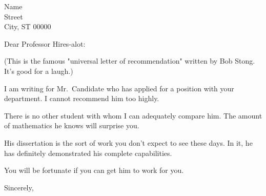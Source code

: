 \documentclass[11pt]{letter}
\begin{document}
\signature{Joe Schmo \\ Professor of Mathematics}

\begin{letter}{Name \\
Street \\
City, ST 00000}

\opening{Dear Professor Hires-alot:}

(This is the famous "universal letter of recommendation" written by Bob Stong. It's good for a laugh.)

I am writing for Mr.~Candidate who has applied for a position with
your department. I cannot recommend him too highly.

There is no other student with whom I can adequately compare him. The amount of mathematics he knows will surprise you.

His dissertation is the sort of work you don't expect to see these days. In it, he has definitely demonstrated his complete capabilities.

You will be fortunate if you can get him to work for you.



\closing{Sincerely,}

\end{letter}
\end{document}
